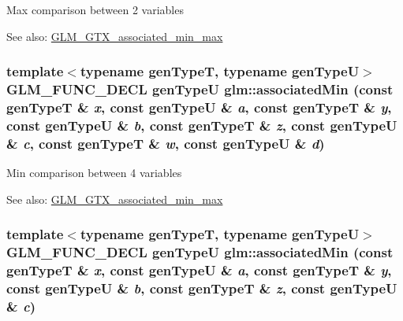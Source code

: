 Max comparison between 2 variables \begin{Desc}
\item[See also:]\hyperlink{group__gtx__associated__min__max}{GLM\_\-GTX\_\-associated\_\-min\_\-max} \end{Desc}
\hypertarget{group__gtx__associated__min__max_g4475cafc0a4696724beef1a584f1678b}{
\subsubsection[associatedMin]{\setlength{\rightskip}{0pt plus 5cm}template$<$typename genTypeT, typename genTypeU$>$ GLM\_\-FUNC\_\-DECL genTypeU glm::associatedMin (const genTypeT \& {\em x}, \/  const genTypeU \& {\em a}, \/  const genTypeT \& {\em y}, \/  const genTypeU \& {\em b}, \/  const genTypeT \& {\em z}, \/  const genTypeU \& {\em c}, \/  const genTypeT \& {\em w}, \/  const genTypeU \& {\em d})}}
\label{group__gtx__associated__min__max_g4475cafc0a4696724beef1a584f1678b}


Min comparison between 4 variables \begin{Desc}
\item[See also:]\hyperlink{group__gtx__associated__min__max}{GLM\_\-GTX\_\-associated\_\-min\_\-max} \end{Desc}
\hypertarget{group__gtx__associated__min__max_g2d68336e5522b3f78f824ae2f0aea8db}{
\subsubsection[associatedMin]{\setlength{\rightskip}{0pt plus 5cm}template$<$typename genTypeT, typename genTypeU$>$ GLM\_\-FUNC\_\-DECL genTypeU glm::associatedMin (const genTypeT \& {\em x}, \/  const genTypeU \& {\em a}, \/  const genTypeT \& {\em y}, \/  const genTypeU \& {\em b}, \/  const genTypeT \& {\em z}, \/  const genTypeU \& {\em c})}}
\label{group__gtx__associated__min__max_g2d68336e5522b3f78f824ae2f0aea8db}


